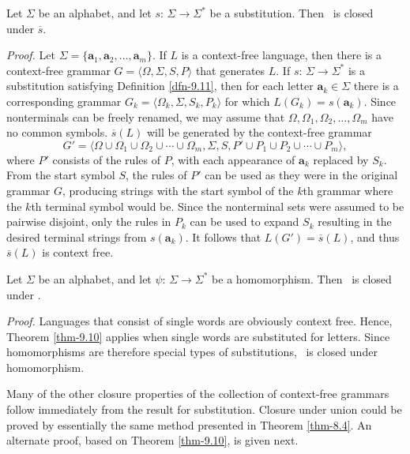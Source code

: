 \begin{thm}\label{thm-9.10}
Let $\Sigma$ be an alphabet, and let $s$: $\Sigma\rightarrow\Sigma^*$ be a
substitution. Then \CSIG\ is closed under $\overline{s}$.

\emph{Proof.} Let $\Sigma=\{\pmb{a}_1,\pmb{a}_2,\ldots,\pmb{a}_m\}$. If $L$ is a
context-free language, then there is a context-free grammar $G=\langle\Omega,
\Sigma,S,P\rangle$ that generates $L$. If $s$: $\Sigma\rightarrow\Sigma^*$ is
a substitution satisfying Definition \ref{dfn-9.11}, then for each letter $\pmb{a}_k\in
\Sigma$ there is a corresponding grammar $G_k=\langle\Omega_k,\Sigma,S_k,P_k
\rangle$ for which $L(G_k)=s(\pmb{a}_k)$. Since nonterminals can be freely
renamed, we may assume that $\Omega,\Omega_1,\Omega_2,\ldots,\Omega_m$ have no
common symbols. $\overline{s}(L)$ will be generated by the context-free grammar
\[ G' = \langle\Omega\cup\Omega_1\cup\Omega_2\cup\cdots\cup\Omega_m,\Sigma,S,P'
	\cup P_1\cup P_2\cup\cdots\cup P_m\rangle, \]
where $P'$ consists of the rules of $P$, with each appearance of $\pmb{a}_k$
replaced by $S_k$. From the start symbol $S$, the rules of $P'$ can be used as
they were in the original grammar $G$, producing strings with the start symbol
of the $k$th grammar where the $k$th terminal symbol would be. Since the
nonterminal sets were assumed to be pairwise disjoint, only the rules in $P_k$
can be used to expand $S_k$ resulting in the desired terminal strings from
$s(\pmb{a}_k)$. It follows that $L(G') = \overline{s}(L)$, and thus
$\overline{s}(L)$ is context free.
\end{thm}

\begin{thm}\label{thm-9.11}
Let $\Sigma$ be an alphabet, and let $\psi$: $\Sigma\rightarrow\Sigma^*$ be a
homomorphism. Then \CSIG\ is closed under \PBAR.

\emph{Proof.} Languages that consist of single words are obviously context free.
Hence, Theorem \ref{thm-9.10} applies when single words are substituted for letters. Since
homomorphisms are therefore special types of substitutions, \CSIG\ is closed
under homomorphism.
\end{thm}

Many of the other closure properties of the collection of context-free grammars
follow immediately from the result for substitution. Closure under union could
be proved by essentially the same method presented in Theorem \ref{thm-8.4}. An alternate
proof, based on Theorem \ref{thm-9.10}, is given next.

